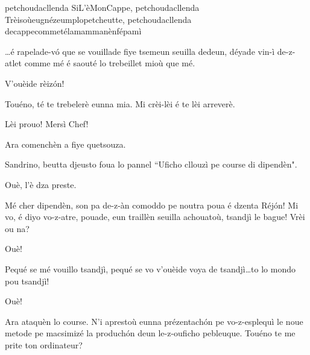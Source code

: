 \begin{drama}

\Saventaspeaks{} petchoudacllenda SiL'èMonCappe, petchoudacllenda Trèisoùeugnézeumplopetcheutte, petchoudacllenda decappecommetélamammanènfépamì

\Treisouspeaks \ldots é rapelade-v\'o que se vouillade fiye tsemeun seuilla dedeun, déyade vin-ì de-z-atlet comme mé é saouté lo trebeillet mioù que mé. 

\Richardspeaks V'ouèide rèiz\'on! 

\Treisouspeaks{} Touéno, té te trebelerè eunna mia. Mi crèi-lèi é te lèi arreverè.

\Tuenospeaks Lèi prouo! Mersì Chef!

\Treisouspeaks Ara comenchèn a fiye quetsouza.



\Treisouspeaks{} Sandrino, beutta djeusto foua lo pannel  ``Uficho cllouzì pe course di dipendèn".

\Sandrinospeaks Ouè, l’è dza preste.



\Treisouspeaks Mé cher dipendèn, son pa de-z-àn comoddo pe noutra poua é dzenta Réj\'on!
Mi vo, é diyo vo-z-atre, pouade, eun traillèn seuilla achouatoù, tsandjì le bague! Vrèi ou na?

\Tcheuttespeaks{} Ouè!

\Treisouspeaks Pequé se mé vouillo tsandjì, pequé se vo v'ouèide voya de tsandjì\ldots to lo mondo pou tsandjì!

\Tcheuttespeaks{} Ouè!

\Treisouspeaks Ara ataquèn lo course. N'i aprestoù eunna prézentach\'on pe vo-z-esplequì le noue metode pe macsimizé la produch\'on deun le-z-ouficho pebleuque.  Touéno te me prite ton ordinateur?



\end{drama}
